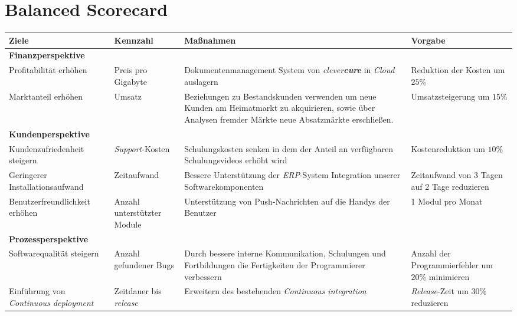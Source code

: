 \section{Balanced Scorecard}
\bgroup
\def\arraystretch{1.5}%
\begin{tabularx}{\textwidth}{ X | X | X | X }
	\hline
	\textbf{Ziele} & \textbf{Kennzahl} & \textbf{Maßnahmen} & \textbf{Vorgabe} \\ \hline
	
	\multicolumn{4}{p{300pt}}{\textbf{Finanzperspektive}} \\ \hline
	
	Profitabilität erhöhen  &
	Preis pro Gigabyte & 
	Dokumentenmanagement System von \emph{clever\textbf{cure}} in \emph{Cloud} auslagern  
	& Reduktion der Kosten um $25\%$ \\ \hline
	
	Marktanteil erhöhen &
	Umsatz &
	Beziehungen zu Bestandskunden verwenden um neue Kunden am Heimatmarkt zu akquirieren, sowie über Analysen fremder Märkte neue Absatzmärkte erschließen.  &
	Umsatzsteigerung um $15\%$ \\ \hline
	
	\multicolumn{4}{p{300pt}}{\textbf{Kundenperspektive}} \\ \hline
	Kundenzufriedenheit steigern & 
	\emph{Support}-Kosten &
	Schulungskosten senken in dem der Anteil an verfügbaren Schulungsvideos erhöht wird &
	Kostenreduktion um $10\%$ \\ \hline
	
	Geringerer Installationsaufwand &
	Zeitaufwand &
	Bessere Unterstützung der \emph{ERP}-System Integration unserer Softwarekomponenten &
	Zeitaufwand von 3 Tagen auf 2 Tage reduzieren \\ \hline  
	
	Benutzerfreundlichkeit erhöhen &
	Anzahl unterstützter Module &
	Unterstützung von Push-Nachrichten auf die Handys der Benutzer &
	1 Modul pro Monat \\ \hline  
	
	\multicolumn{4}{p{300pt}}{\textbf{Prozessperspektive}} \\ \hline
	Softwarequalität steigern & 
	Anzahl gefundener Bugs &
	Durch bessere interne Kommunikation, Schulungen und Fortbildungen die Fertigkeiten der Programmierer verbessern  &
	Anzahl der Programmierfehler um $20\%$ minimieren \\ \hline
	
	Einführung von \emph{Continuous deployment} &
	Zeitdauer bis \emph{release} &
	Erweitern des bestehenden \emph{Continuous integration} &
	\emph{Release}-Zeit um $30\%$ reduzieren \\ \hline 
	

\end{tabularx}
